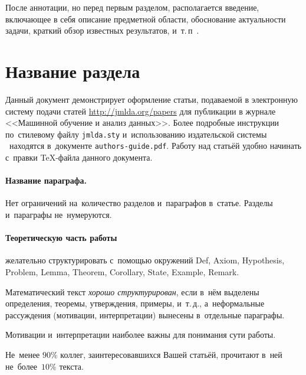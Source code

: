 \documentclass[12pt,twoside]{article}
\begin{document}
После аннотации, но перед первым разделом,
располагается введение, включающее в себя
описание предметной области,
обоснование актуальности задачи,
краткий обзор известных результатов,
и~т.\,п~\cite{author09anyscience,myHandbook,author09first-word-of-the-title,voron06latex,author-and-co2007,Lvovsky03}.

\section{Название раздела}
Данный документ демонстрирует оформление статьи,
подаваемой в электронную систему подачи статей \url{http://jmlda.org/papers} для публикации в журнале <<Машинной обучение и анализ данных>>.
Более подробные инструкции по~стилевому файлу \texttt{jmlda.sty}
и~использованию издательской системы \LaTeXe\
находятся в~документе \texttt{authors-guide.pdf}.
Работу над статьёй удобно начинать с~правки \TeX-файла данного документа.

\paragraph{Название параграфа.}
Нет ограничений на~количество разделов и~параграфов в~статье.
Разделы и~параграфы не~нумеруются.

\paragraph{Теоретическую часть работы} желательно структурировать
с~помощью окружений
Def, Axiom, Hypothesis, Problem, Lemma, Theorem, Corollary, State, Example, Remark.

\begin{Def}
    Математический текст \emph{хорошо структурирован},
    если в~нём выделены определения, теоремы, утверждения, примеры, и~т.\,д.,
    а~неформальные рассуждения (мотивации, интерпретации)
    вынесены в~отдельные параграфы.
\end{Def}

\begin{State}
    Мотивации и~интерпретации наиболее важны для понимания сути работы.
\end{State}

\begin{Theorem}
    Не~менее $90\%$ коллег, заинтересовавшихся Вашей статьёй,
    прочитают в~ней не~более~$10\%$ текста.
\end{Theorem}
\end{document}
